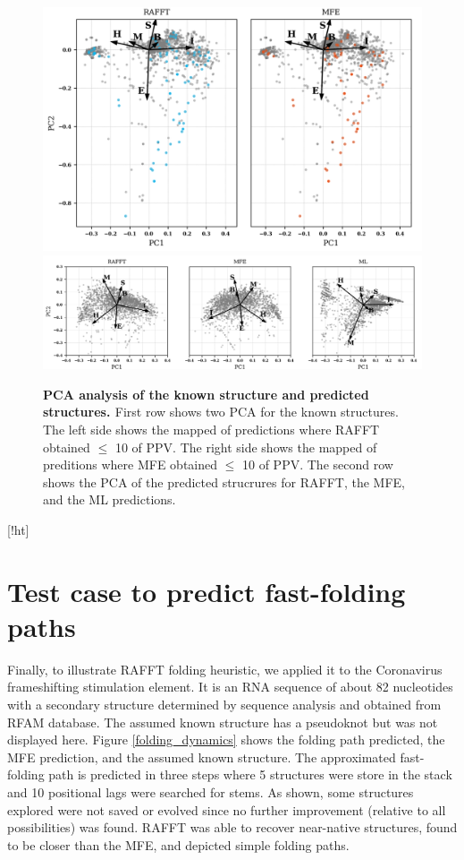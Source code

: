 \documentclass[a4paper,12pt]{article}
\begin{document}
{{\begin{figure}[!ht]
  \centering
  \includegraphics[scale=0.5]{img/pca_known.png}\\
  \includegraphics[scale=0.7]{img/pca_predicted.png} 
  \caption{\textbf{PCA analysis of the known structure and predicted structures. \label{pca_struct}}
    First row shows two PCA for the known structures.
    The left side shows the mapped of predictions where RAFFT obtained $\leq$ 10 of PPV.
    The right side shows the mapped of preditions where MFE obtained $\leq$ 10 of PPV.
    The second row shows the PCA of the predicted strucrures for RAFFT, the MFE, and the ML predictions.}
\end{figure}[!ht]

\clearpage
\section{Test case to predict fast-folding paths}
\label{sec:orgb2cf62d}
Finally, to illustrate RAFFT folding heuristic, we applied it to the Coronavirus
frameshifting stimulation element. It is an RNA sequence of about 82 nucleotides
with a secondary structure determined by sequence analysis and obtained from
RFAM database. The assumed known structure has a pseudoknot but was not
displayed here. Figure \ref{folding_dynamics} shows the folding path predicted,
the MFE prediction, and the assumed known structure. The approximated
fast-folding path is predicted in three steps where 5 structures were store in
the stack and 10 positional lags were searched for stems. As shown, some
structures explored were not saved or evolved since no further improvement
(relative to all possibilities) was found. RAFFT was able to recover near-native
structures, found to be closer than the MFE, and depicted simple folding paths.

}}
\end{document}
